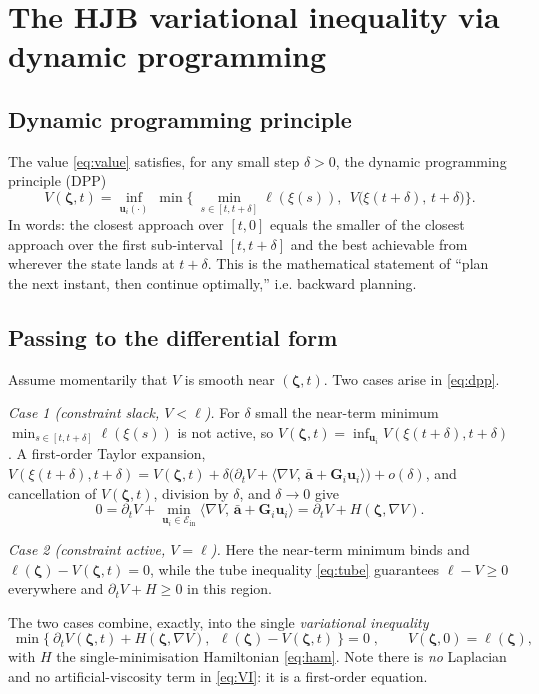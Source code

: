\documentclass[11pt]{article}
\newcommand{\Ein}{\mathcal{E}_{\mathrm{in}}}
\newcommand{\zbf}{\bm{\zeta}}
\newcommand{\abf}{\bar{\bm{a}}}
\newcommand{\Gbf}{\bm{G}}
\newcommand{\ubf}{\bm{u}}
\newcommand{\inner}[2]{\langle #1,\, #2\rangle}
\begin{document}
\section{The HJB variational inequality via dynamic programming}

\subsection{Dynamic programming principle}

The value \eqref{eq:value} satisfies, for any small step $\delta>0$, the dynamic programming
principle (DPP)
\begin{equation}\label{eq:dpp}
V(\zbf,t)=\inf_{\ubf_i(\cdot)}\ \min\Big\{\ \min_{s\in[t,t+\delta]}\ell(\xi(s)),\ \
V\big(\xi(t+\delta),\,t+\delta\big)\Big\}.
\end{equation}
In words: the closest approach over $[t,0]$ equals the smaller of the closest approach over the
first sub-interval $[t,t+\delta]$ and the best achievable from wherever the state lands at
$t+\delta$. This is the mathematical statement of ``plan the next instant, then continue
optimally,'' i.e. backward planning.

\subsection{Passing to the differential form}

Assume momentarily that $V$ is smooth near $(\zbf,t)$. Two cases arise in \eqref{eq:dpp}.

\emph{Case 1 (constraint slack, $V<\ell$).} For $\delta$ small the near-term minimum
$\min_{s\in[t,t+\delta]}\ell(\xi(s))$ is not active, so
$V(\zbf,t)=\inf_{\ubf_i}V(\xi(t+\delta),t+\delta)$. A first-order Taylor expansion,
$V(\xi(t+\delta),t+\delta)=V(\zbf,t)+\delta\big(\partial_t V+\inner{\nabla V}{\abf+\Gbf_i\ubf_i}\big)+o(\delta)$,
and cancellation of $V(\zbf,t)$, division by $\delta$, and $\delta\to0$ give
\begin{equation}
0=\partial_t V+\min_{\ubf_i\in\Ein}\inner{\nabla V}{\abf+\Gbf_i\ubf_i}
=\partial_t V+H(\zbf,\nabla V).
\end{equation}

\emph{Case 2 (constraint active, $V=\ell$).} Here the near-term minimum binds and
$\ell(\zbf)-V(\zbf,t)=0$, while the tube inequality \eqref{eq:tube} guarantees
$\ell-V\ge0$ everywhere and $\partial_t V+H\ge0$ in this region.

The two cases combine, exactly, into the single \emph{variational inequality}
\begin{equation}\label{eq:VI}
\boxed{\;\min\Big\{\ \partial_t V(\zbf,t)+H(\zbf,\nabla V),\ \ \ell(\zbf)-V(\zbf,t)\ \Big\}=0\;},
\qquad V(\zbf,0)=\ell(\zbf),
\end{equation}
with $H$ the single-minimisation Hamiltonian \eqref{eq:ham}. Note there is \emph{no} Laplacian
and no artificial-viscosity term in \eqref{eq:VI}: it is a first-order equation.
\end{document}
